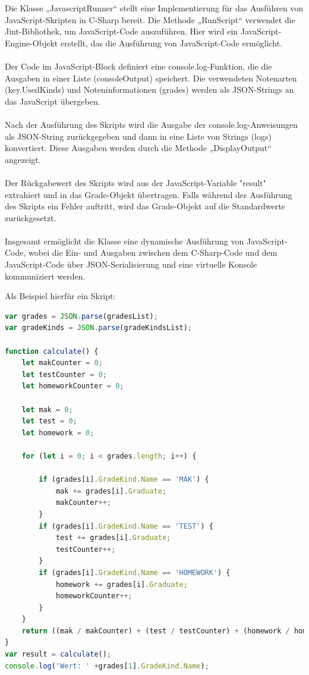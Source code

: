 Die Klasse „JavascriptRunner“ stellt eine Implementierung für das Ausführen von JavaScript-Skripten 
in C-Sharp bereit. Die Methode „RunScript“ verwendet die Jint-Bibliothek, um JavaScript-Code auszuführen. 
Hier wird ein JavaScript-Engine-Objekt erstellt, das die Ausführung von JavaScript-Code ermöglicht.
\\\\
Der Code im JavaScript-Block definiert eine console.log-Funktion, die die Ausgaben in einer 
Liste (consoleOutput) speichert. Die verwendeten Notenarten (key.UsedKinds) und Noteninformationen (grades) 
werden als JSON-Strings an das JavaScript übergeben.
\\\\
Nach der Ausführung des Skripts wird die Ausgabe der console.log-Anweisungen als JSON-String zurückgegeben 
und dann in eine Liste von Strings (logs) konvertiert. Diese Ausgaben werden durch die 
Methode „DisplayOutput“ angezeigt.
\\\\
Der Rückgabewert des Skripts wird aus der JavaScript-Variable "result" extrahiert und in das Grade-Objekt 
übertragen. Falls während der Ausführung des Skripts ein Fehler auftritt, wird das Grade-Objekt auf 
die Standardwerte zurückgesetzt.
\\\\
Insgesamt ermöglicht die Klasse eine dynamische Ausführung von JavaScript-Code, wobei die Ein- und Ausgaben 
zwischen dem C-Sharp-Code und dem JavaScript-Code über JSON-Serialisierung und eine 
virtuelle Konsole kommuniziert werden.



\newpage
Als Beispiel hierfür ein Skript:
\begin{lstlisting}[language={JavaScript},caption=Javascript-Skript,label=lst:impl:jstest]
var grades = JSON.parse(gradesList);
var gradeKinds = JSON.parse(gradeKindsList);

function calculate() {
    let makCounter = 0;
    let testCounter = 0;
    let homeworkCounter = 0;

    let mak = 0;
    let test = 0;
    let homework = 0;

    for (let i = 0; i < grades.length; i++) {

        if (grades[i].GradeKind.Name == 'MAK') {
            mak += grades[i].Graduate;
            makCounter++;
        }
        if (grades[i].GradeKind.Name == 'TEST') {
            test += grades[i].Graduate;
            testCounter++;
        }
        if (grades[i].GradeKind.Name == 'HOMEWORK') {
            homework += grades[i].Graduate;
            homeworkCounter++;
        }
    }
    return ((mak / makCounter) + (test / testCounter) + (homework / homeworkCounter)) / 3;
}
var result = calculate();
console.log('Wert: ' +grades[1].GradeKind.Name);
\end{lstlisting}

